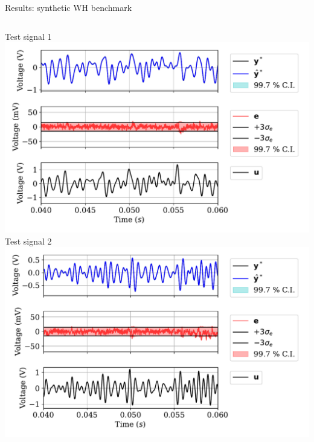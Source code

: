 \documentclass{beamer}
\begin{document}
\begin{frame}{Results: synthetic WH benchmark}
\begin{columns}
\centering
Test signal 1
\includegraphics[width=.9\textwidth]{img/uncertainty/MULTISINE_1.pdf}
\centering
Test signal 2
\includegraphics[width=.9\textwidth]{img/uncertainty/MULTISINE_2.pdf}
\end{columns}


\end{frame}
\end{document}
